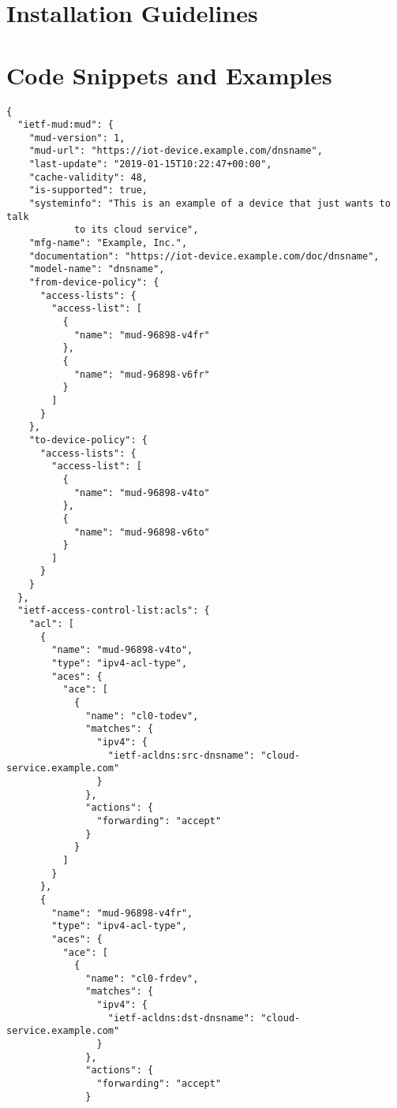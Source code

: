 \appendix

\chapter{Installation Guidelines}


\chapter{Code Snippets and Examples}

\begin{verbatim}
{
  "ietf-mud:mud": {
    "mud-version": 1,
    "mud-url": "https://iot-device.example.com/dnsname",
    "last-update": "2019-01-15T10:22:47+00:00",
    "cache-validity": 48,
    "is-supported": true,
    "systeminfo": "This is an example of a device that just wants to talk
		    to its cloud service",
    "mfg-name": "Example, Inc.",
    "documentation": "https://iot-device.example.com/doc/dnsname",
    "model-name": "dnsname",
    "from-device-policy": {
      "access-lists": {
        "access-list": [
          {
            "name": "mud-96898-v4fr"
          },
          {
            "name": "mud-96898-v6fr"
          }
        ]
      }
    },
    "to-device-policy": {
      "access-lists": {
        "access-list": [
          {
            "name": "mud-96898-v4to"
          },
          {
            "name": "mud-96898-v6to"
          }
        ]
      }
    }
  },
  "ietf-access-control-list:acls": {
    "acl": [
      {
        "name": "mud-96898-v4to",
        "type": "ipv4-acl-type",
        "aces": {
          "ace": [
            {
              "name": "cl0-todev",
              "matches": {
                "ipv4": {
                  "ietf-acldns:src-dnsname": "cloud-service.example.com"
                }
              },
              "actions": {
                "forwarding": "accept"
              }
            }
          ]
        }
      },
      {
        "name": "mud-96898-v4fr",
        "type": "ipv4-acl-type",
        "aces": {
          "ace": [
            {
              "name": "cl0-frdev",
              "matches": {
                "ipv4": {
                  "ietf-acldns:dst-dnsname": "cloud-service.example.com"
                }
              },
              "actions": {
                "forwarding": "accept"
              }

\end{verbatim}
